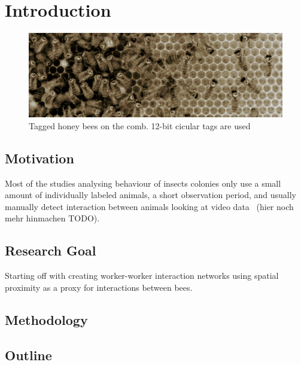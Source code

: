 \chapter{Introduction}
\label{ch:intro}

\begin{figure}[htb]
	\centering
	\includegraphics[width=1.0\textwidth]{Figures/markers}
	\caption{Tagged honey bees on the comb. 12-bit cicular tags are used}
	\label{fig:markers}
\end{figure}

\section{Motivation}

Most of the studies analysing behaviour of insects colonies only use a small amount of individually labeled animals, a short observation period, and usually manually detect interaction between animals looking at video data~\cite{quevillon2015social} (hier noch mehr hinmachen TODO).

\section{Research Goal}

Starting off with creating worker-worker interaction networks using spatial proximity as a proxy for interactions between bees.



\section{Methodology}

\section{Outline}